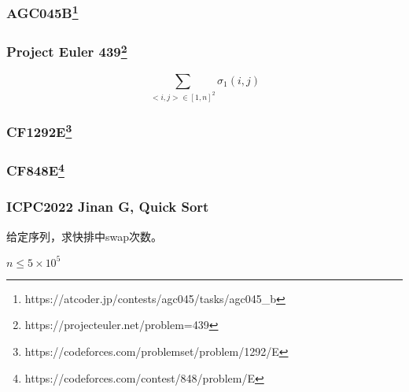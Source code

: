 \documentclass[10pt]{beamer}
\begin{document}
	\clearpage
	\begin{frame}
		\frametitle{AGC045B\footnote{https://atcoder.jp/contests/agc045/tasks/agc045\_b}}
	
	\end{frame}
	\clearpage
	\begin{frame}
		\frametitle{Project Euler 439\footnote{https://projecteuler.net/problem=439}}
	
		$$
		\sum_{<i,j>\in[1,n]^2}\sigma_1(i,j)
		$$
	
	\end{frame}
	\clearpage
	\begin{frame}
		\frametitle{CF1292E\footnote{https://codeforces.com/problemset/problem/1292/E}}
	
	\end{frame}
	\clearpage
	\begin{frame}
		\frametitle{CF848E\footnote{https://codeforces.com/contest/848/problem/E}}
	
	\end{frame}
	\clearpage
	\begin{frame}
		\frametitle{ICPC2022 Jinan G, Quick Sort}

		给定序列，求快排中swap次数。

		$n\le 5\times 10^5$
	
	\end{frame}
\end{document}
